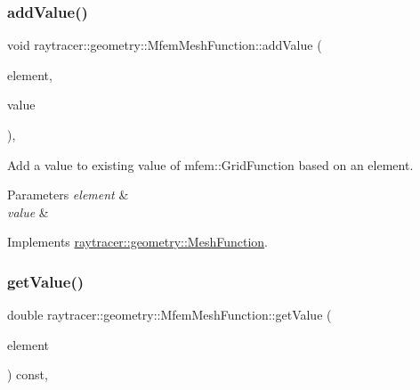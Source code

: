 \subsubsection{\texorpdfstring{add\+Value()}{addValue()}}
{\footnotesize\ttfamily void raytracer\+::geometry\+::\+Mfem\+Mesh\+Function\+::add\+Value (\begin{DoxyParamCaption}\item[{const \hyperlink{classraytracer_1_1geometry_1_1Element}{Element} \&}]{element,  }\item[{double}]{value }\end{DoxyParamCaption})\hspace{0.3cm}{\ttfamily [override]}, {\ttfamily [virtual]}}



Add a value to existing value of mfem\+::\+Grid\+Function based on an element. 


\begin{DoxyParams}{Parameters}
{\em element} & \\
\hline
{\em value} & \\
\hline
\end{DoxyParams}


Implements \hyperlink{classraytracer_1_1geometry_1_1MeshFunction_a5a5908cb7ce59486d3fe987f73d040b6}{raytracer\+::geometry\+::\+Mesh\+Function}.

\mbox{\label{classraytracer_1_1geometry_1_1MfemMeshFunction_a76b37f146c8471f95c0e2486024857f7}} 
\subsubsection{\texorpdfstring{get\+Value()}{getValue()}}
{\footnotesize\ttfamily double raytracer\+::geometry\+::\+Mfem\+Mesh\+Function\+::get\+Value (\begin{DoxyParamCaption}\item[{const \hyperlink{classraytracer_1_1geometry_1_1Element}{Element} \&}]{element }\end{DoxyParamCaption}) const\hspace{0.3cm}{\ttfamily [override]}, {\ttfamily [virtual]}}



